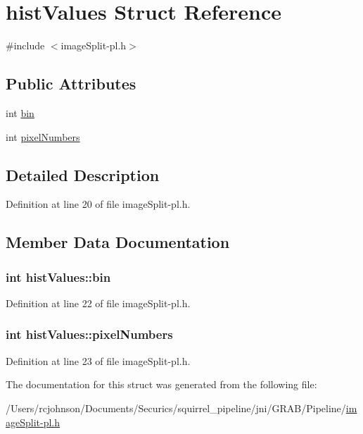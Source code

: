 \hypertarget{structhist_values}{\section{hist\-Values Struct Reference}
\label{structhist_values}
}


{\ttfamily \#include $<$image\-Split-\/pl.\-h$>$}

\subsection*{Public Attributes}
\begin{DoxyCompactItemize}
\item 
int \hyperlink{structhist_values_a91d3023e7a5c39ec43514b8346538a60}{bin}
\item 
int \hyperlink{structhist_values_adf352dad6a47fa6e60d77e9e5dd8abf8}{pixel\-Numbers}
\end{DoxyCompactItemize}


\subsection{Detailed Description}


Definition at line 20 of file image\-Split-\/pl.\-h.



\subsection{Member Data Documentation}
\hypertarget{structhist_values_a91d3023e7a5c39ec43514b8346538a60}{
\subsubsection[{bin}]{\setlength{\rightskip}{0pt plus 5cm}int hist\-Values\-::bin}}\label{structhist_values_a91d3023e7a5c39ec43514b8346538a60}


Definition at line 22 of file image\-Split-\/pl.\-h.

\hypertarget{structhist_values_adf352dad6a47fa6e60d77e9e5dd8abf8}{
\subsubsection[{pixel\-Numbers}]{\setlength{\rightskip}{0pt plus 5cm}int hist\-Values\-::pixel\-Numbers}}\label{structhist_values_adf352dad6a47fa6e60d77e9e5dd8abf8}


Definition at line 23 of file image\-Split-\/pl.\-h.



The documentation for this struct was generated from the following file\-:\begin{DoxyCompactItemize}
\item 
/\-Users/rcjohnson/\-Documents/\-Securics/squirrel\-\_\-pipeline/jni/\-G\-R\-A\-B/\-Pipeline/\hyperlink{image_split-pl_8h}{image\-Split-\/pl.\-h}\end{DoxyCompactItemize}
